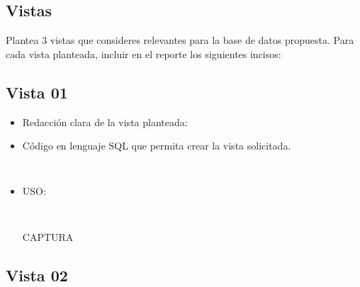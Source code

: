 \subsection{Vistas}

Plantea 3 vistas que consideres relevantes para la base de datos propuesta. Para cada vista planteada, incluir en el reporte los siguientes incisos:

\subsection*{Vista 01}

\begin{itemize}
    \item Redacción clara de la vista planteada: 
    \item Código en lenguaje SQL que permita crear la vista solicitada.
    
    \begin{lstlisting}[caption={Tablas para la BdDatos}, label={lst:sql_estadios}]
      
    \end{lstlisting}    
    
    \item USO:
    
    \begin{lstlisting}[caption={Tablas para la BdDatos}, label={lst:sql_estadios}]
      
    \end{lstlisting}    

    \begin{center}
      CAPTURA
    \end{center}
\end{itemize}


\subsection*{Vista 02}

